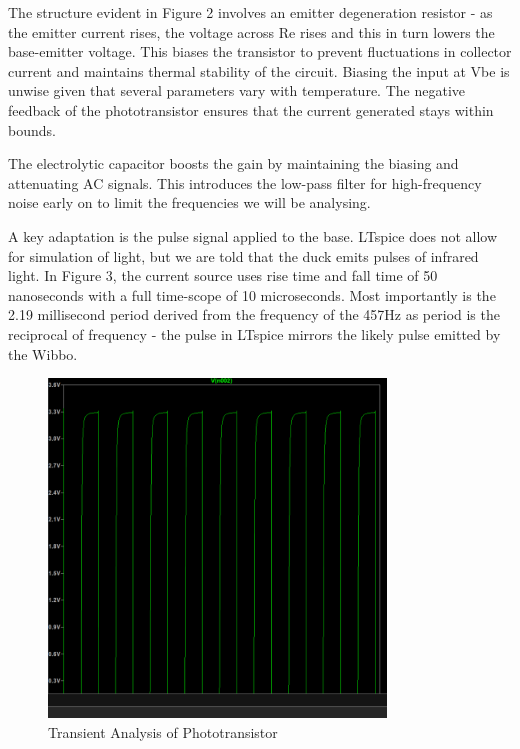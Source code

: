 The structure evident in Figure 2 involves an emitter degeneration resistor - as the emitter current rises, the voltage across Re rises and this in turn lowers the base-emitter voltage. This biases the transistor to prevent fluctuations in collector current and maintains thermal stability of the circuit. Biasing the input at Vbe is unwise given that several parameters vary with temperature. The negative feedback of the phototransistor ensures that the current generated stays within bounds.

The electrolytic capacitor boosts the gain by maintaining the biasing and attenuating AC signals. This introduces the low-pass filter for high-frequency noise early on to limit the frequencies we will be analysing.

A key adaptation is the pulse signal applied to the base. LTspice does not allow for simulation of light, but we are told that the duck emits pulses of infrared light. In Figure 3, the current source uses rise time and fall time of 50 nanoseconds with a full time-scope of 10 microseconds. Most importantly is the 2.19 millisecond period derived from the frequency of the 457Hz as period is the reciprocal of frequency - the pulse in LTspice mirrors the likely pulse emitted by the Wibbo.

\begin{figure}[h]
    \centering
    \includegraphics[width=0.8\textwidth]{subpages/images/pt_transient.png}
    \caption{Transient Analysis of Phototransistor}
    \label{fig:phototransistor_transient}
\end{figure}

